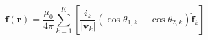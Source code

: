 \documentclass[border=2pt,varwidth]{standalone}
\begin{document}
\[
  \mathbf{f}(\mathbf{r}) =
  \frac{\mu_0}{4\pi}
  \sum_{k=1}^K
  \left [
    \frac{i_k}{\left | \mathbf{v}_k \right |}
    \left (
      \cos \theta_{1,k} - \cos \theta_{2,k}
    \right )
    \hat{\mathbf{f}}_k
  \right ]
\]
\end{document}
